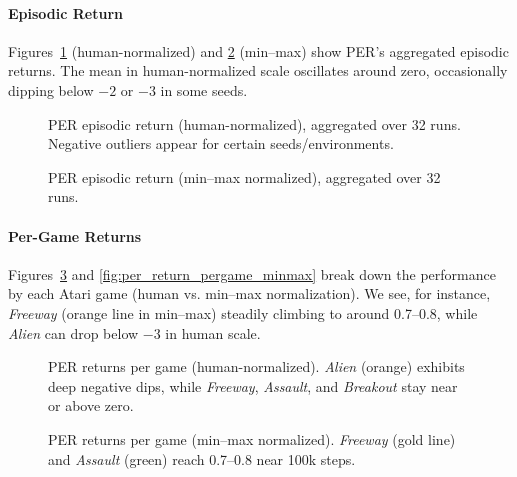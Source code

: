 \paragraph{Episodic Return}
Figures~\ref{fig:per_return_human} (human-normalized) and \ref{fig:per_return_minmax} (min--max) show PER's aggregated episodic returns. The mean in human-normalized scale oscillates around zero, occasionally dipping below $-2$ or $-3$ in some seeds.

\begin{figure}
	\centering
	
	\caption{PER episodic return (human-normalized), aggregated over 32 runs. 
		Negative outliers appear for certain seeds/environments.}
	\label{fig:per_return_human}
\end{figure}

\begin{figure}
	\centering
	
	\caption{PER episodic return (min--max normalized), aggregated over 32 runs.}
	\label{fig:per_return_minmax}
\end{figure}

\paragraph{Per-Game Returns}
Figures~\ref{fig:per_return_pergame_human} and \vref{fig:per_return_pergame_minmax} break down the performance by each Atari game (human vs. min--max normalization). We see, for instance, \emph{Freeway} (orange line in min--max) steadily climbing to around 0.7--0.8, while \emph{Alien} can drop below $-3$ in human scale. 

\begin{figure}
	\centering
	
	\caption{PER returns per game (human-normalized). 
		\emph{Alien} (orange) exhibits deep negative dips, 
		while \emph{Freeway}, \emph{Assault}, and \emph{Breakout} stay near or above zero.}
	\label{fig:per_return_pergame_human}
\end{figure}

\begin{figure}
	\centering
	
	\caption{PER returns per game (min--max normalized). 
		\emph{Freeway} (gold line) and \emph{Assault} (green) reach 0.7--0.8 near 100k steps.}
	\label{fig:per_return_pergame_minmax}
\end{figure}

